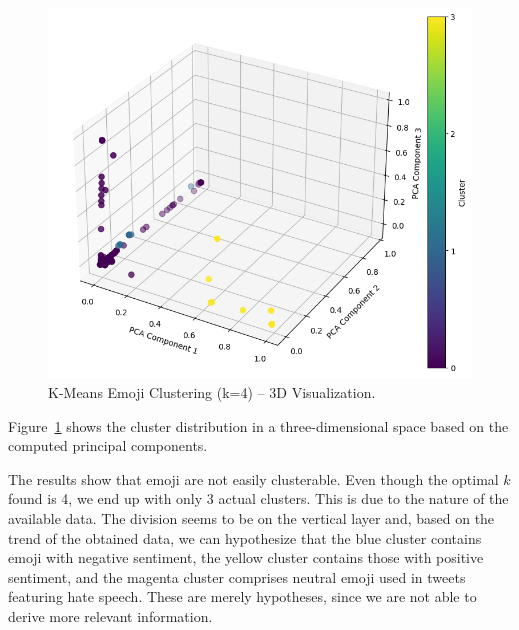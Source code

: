 \begin{figure}
    \includegraphics[width=\columnwidth]{../../results/images/emoji_cluster.png}
    \caption{K-Means Emoji Clustering (k=4) – 3D Visualization.}
    \label{fig:3d_clustering}
\end{figure}

Figure~\ref{fig:3d_clustering} shows the cluster distribution in a three-dimensional space based on the computed principal components.

The results show that emoji are not easily clusterable. Even though the optimal \( k \) found is 4, we end up with only 3 actual clusters. This is due to the nature of the available data. The division seems to be on the vertical layer and, based on the trend of the obtained data, we can hypothesize that the blue cluster contains emoji with negative sentiment, the yellow cluster contains those with positive sentiment, and the magenta cluster comprises neutral emoji used in tweets featuring hate speech. These are merely hypotheses, since we are not able to derive more relevant information.

